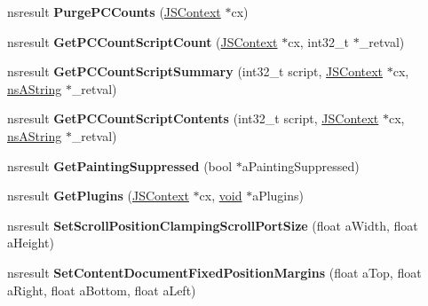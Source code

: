 \begin{DoxyCompactItemize}
\mbox{\label{interfacens_i_d_o_m_window_utils_a0943c4df8b36ef4aeb44bd926059f782}} 
nsresult {\bfseries Purge\+P\+C\+Counts} (\hyperlink{interfacevoid}{J\+S\+Context} $\ast$cx)
\item 
\mbox{\label{interfacens_i_d_o_m_window_utils_a8fe6eb77e6cc205cd132682f5ea2c0f8}} 
nsresult {\bfseries Get\+P\+C\+Count\+Script\+Count} (\hyperlink{interfacevoid}{J\+S\+Context} $\ast$cx, int32\+\_\+t $\ast$\+\_\+retval)
\item 
\mbox{\label{interfacens_i_d_o_m_window_utils_a1b7da3bc71600e88a555d9b9ffc6651e}} 
nsresult {\bfseries Get\+P\+C\+Count\+Script\+Summary} (int32\+\_\+t script, \hyperlink{interfacevoid}{J\+S\+Context} $\ast$cx, \hyperlink{structns_string_container}{ns\+A\+String} $\ast$\+\_\+retval)
\item 
\mbox{\label{interfacens_i_d_o_m_window_utils_aa7cfc45701762240debf9d3bf82bf8c8}} 
nsresult {\bfseries Get\+P\+C\+Count\+Script\+Contents} (int32\+\_\+t script, \hyperlink{interfacevoid}{J\+S\+Context} $\ast$cx, \hyperlink{structns_string_container}{ns\+A\+String} $\ast$\+\_\+retval)
\item 
\mbox{\label{interfacens_i_d_o_m_window_utils_a05daecd0e4f1f44703ad6a375c8e589c}} 
nsresult {\bfseries Get\+Painting\+Suppressed} (bool $\ast$a\+Painting\+Suppressed)
\item 
\mbox{\label{interfacens_i_d_o_m_window_utils_a9e7da386342ab6fc3b09fad6a619ddd8}} 
nsresult {\bfseries Get\+Plugins} (\hyperlink{interfacevoid}{J\+S\+Context} $\ast$cx, \hyperlink{interfacevoid}{void} $\ast$a\+Plugins)
\item 
\mbox{\label{interfacens_i_d_o_m_window_utils_a64e51188beed1c4acbeaca367f75891f}} 
nsresult {\bfseries Set\+Scroll\+Position\+Clamping\+Scroll\+Port\+Size} (float a\+Width, float a\+Height)
\item 
\mbox{\label{interfacens_i_d_o_m_window_utils_ac504a8bf3db2a752bd1286fedd33f073}} 
nsresult {\bfseries Set\+Content\+Document\+Fixed\+Position\+Margins} (float a\+Top, float a\+Right, float a\+Bottom, float a\+Left)

\end{DoxyCompactItemize}
